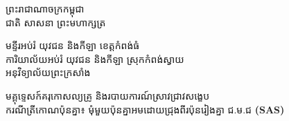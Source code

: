 \documentclass[a4paper,12pt]{article}
\newcommand{\enbf}[1]{{\TimesEn\textbf{#1}}}
\newcommand{\khmflourish}{{\Tacteing\fontsize{38pt}{15pt}\selectfont\raisebox{-5pt}{3}}}
\begin{document}
\thispagestyle{firstpage}
\fontsize{11.5pt}{18.2pt}\selectfont
\vspace*{-0.75cm}

\begin{center}
  {\muol\fontsize{13.5pt}{21pt}\selectfont ព្រះរាជាណាចក្រកម្ពុជា}\\[2pt]
  {\muol\fontsize{12pt}{18.5pt}\selectfont ជាតិ សាសនា ព្រះមហាក្សត្រ}\\[1pt]
  \khmflourish
\end{center}

\vspace{-12pt}
{\muol\fontsize{10.8pt}{17pt}\selectfont
មន្ទីរអប់រំ យុវជន និងកីឡា ខេត្តកំពង់ធំ\\
ការិយាល័យអប់រំ យុវជន និងកីឡា ស្រុកកំពង់ស្វាយ\\
អនុវិទ្យាល័យព្រះក្រសាំង}

\vspace{6pt}
\begin{center}
  {\muol\fontsize{14pt}{22pt}\selectfont មគ្គុទ្ទេសក៍គរុកោសល្យគ្រូ និងរបាយការណ៍ស្រាវជ្រាវសង្ខេប}\\[3pt]
  {\muol\fontsize{11.5pt}{18pt}\selectfont ករណីត្រីកោណប៉ុនគ្នា៖ មុំមួយប៉ុនគ្នាអមដោយជ្រុងពីរប៉ុនរៀងគ្នា ជ.ម.ជ \enbf{(SAS)}}
\end{center}

\vspace{4pt}
\end{document}

